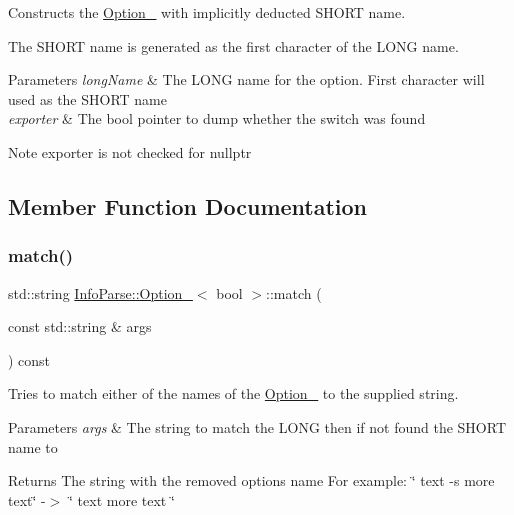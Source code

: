 Constructs the \mbox{\hyperlink{class_info_parse_1_1_option__}{Option\+\_\+}} with implicitly deducted S\+H\+O\+RT name.

The S\+H\+O\+RT name is generated as the first character of the L\+O\+NG name.


\begin{DoxyParams}{Parameters}
{\em long\+Name}
    & The L\+O\+NG name for the option. First character will used as the S\+H\+O\+RT name \\
    \hline
    {\em exporter} & The bool pointer to dump whether the switch was found\\
    \hline
\end{DoxyParams}
\begin{DoxyNote}{Note}
{\ttfamily exporter}
    is not checked for {\ttfamily nullptr}
\end{DoxyNote}


\subsection{Member Function Documentation}
\mbox{\label{class_info_parse_1_1_option___3_01bool_01_4_a45655f1d4d59a0e76e208794c1c1e44e}}
\subsubsection{\texorpdfstring{match()}{match()}}
{\footnotesize\ttfamily std\+::string \mbox{\hyperlink{class_info_parse_1_1_option__}{Info\+Parse\+::\+Option\+\_\+}}$<$ bool $>$\+::match (\begin{DoxyParamCaption}
                                                                                                                                                \item[{const std\+::string \&}]{args }
\end{DoxyParamCaption}) const}



Tries to match either of the names of the \mbox{\hyperlink{class_info_parse_1_1_option__}{Option\+\_\+}} to the supplied string.


\begin{DoxyParams}{Parameters}
{\em args}
    & The string to match the L\+O\+NG then if not found the S\+H\+O\+RT name to \\
    \hline
\end{DoxyParams}
\begin{DoxyReturn}{Returns}
    The string with the removed options\textquotesingle{} name For example\+: \char`\"{} text -\/s more text\char`\"{} -\/$>$ \char`\"{} text more text \char`\"{}
\end{DoxyReturn}
\mbox{\label{class_info_parse_1_1_option___3_01bool_01_4_ab97cc00e9a115cad44ce6adf83d93201}}
